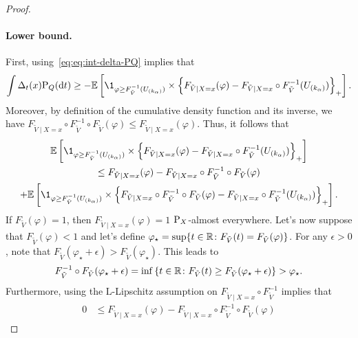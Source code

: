 \begin{proof}
\paragraph{Lower bound.}
  First, using~\eqref{eq:eq:int-delta-PQ} implies that
  \begin{equation*}
    \int \Delta_{t}(x) \textup{P}_Q(\rmd t)
    \ge - \E\br{ \1_{\varphi \ge F_{\tilde{V}}^{-1}(U_{(k_\alpha)})} \times \ac{ F_{\tilde{V}\mid X=x}(\varphi) - F_{\tilde{V}\mid X=x}\circ F_{\tilde{V}}^{-1}(U_{(k_{\alpha})}) }_{+} }.
  \end{equation*}
  Moreover, by definition of the cumulative density function and its inverse, we have 
  $
    F_{\tilde{V}\mid X=x}\circ F_{\tilde{V}}^{-1} \circ F_{\tilde{V}}(\varphi)
    \le F_{\tilde{V}\mid X=x}(\varphi)
  $.
  Thus, it follows that
  \begin{multline}\label{eq:bound:expec-Delta}
    \E\br{ \1_{\varphi \ge F_{\tilde{V}}^{-1}(U_{(k_\alpha)})} \times \ac{ F_{\tilde{V}\mid X=x}(\varphi) - F_{\tilde{V}\mid X=x}\circ F_{\tilde{V}}^{-1}(U_{(k_{\alpha})}) }_{+} }
    \\
    \le F_{\tilde{V}\mid X=x}(\varphi) - F_{\tilde{V}\mid X=x}\circ F_{\tilde{V}}^{-1} \circ F_{\tilde{V}}(\varphi)
    \\
    + \E\br{ \1_{\varphi \ge F_{\tilde{V}}^{-1}(U_{(k_\alpha)})} \times \ac{ F_{\tilde{V}\mid X=x}\circ F_{\tilde{V}}^{-1} \circ F_{\tilde{V}}(\varphi) - F_{\tilde{V}\mid X=x}\circ F_{\tilde{V}}^{-1}(U_{(k_{\alpha})}) }_{+} }
        .
  \end{multline}
  If $F_{\tilde{V}}(\varphi)=1$, then $F_{\tilde{V}\mid X=x}(\varphi)=1$ $\textup{P}_{X}$-almost everywhere.
  Let's now suppose that $F_{\tilde{V}}(\varphi)<1$ and let's define $\varphi_\star = \sup\{t\in\mathbb{R}\colon F_{\tilde{V}}(t)=F_{\tilde{V}}(\varphi)\}$.
  For any $\epsilon>0$, note that $F_{\tilde{V}}(\varphi_\star + \epsilon) > F_{\tilde{V}}(\varphi_{\star})$. This leads to
  \begin{equation*}
    F_{\tilde{V}}^{-1} \circ F_{\tilde{V}}(\varphi_\star + \epsilon)
    = \inf\left\{{t\in\mathbb{R}\colon F_{\tilde{V}}(t) \ge F_{\tilde{V}}(\varphi_\star + \epsilon)}\right\}
    > \varphi_{\star}.
  \end{equation*}
  Furthermore, using the $\mathrm{L}$-Lipschitz assumption on $F_{\tilde{V}\mid X=x}\circ F_{\tilde{V}}^{-1}$ implies that
  \begin{align}
    \nonumber
    0
    &\le F_{\tilde{V}\mid X=x}(\varphi) - F_{\tilde{V}\mid X=x}\circ F_{\tilde{V}}^{-1} \circ F_{\tilde{V}}(\varphi)

\end{align}
\end{proof}
